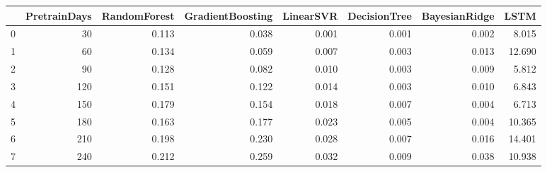\begin{tabular}{lrrrrrrr}
\toprule
{} &  PretrainDays &  RandomForest &  GradientBoosting &  LinearSVR &  DecisionTree &  BayesianRidge &   LSTM \\
\midrule
0 &            30 &         0.113 &             0.038 &      0.001 &         0.001 &          0.002 &  8.015 \\
1 &            60 &         0.134 &             0.059 &      0.007 &         0.003 &          0.013 & 12.690 \\
2 &            90 &         0.128 &             0.082 &      0.010 &         0.003 &          0.009 &  5.812 \\
3 &           120 &         0.151 &             0.122 &      0.014 &         0.003 &          0.010 &  6.843 \\
4 &           150 &         0.179 &             0.154 &      0.018 &         0.007 &          0.004 &  6.713 \\
5 &           180 &         0.163 &             0.177 &      0.023 &         0.005 &          0.004 & 10.365 \\
6 &           210 &         0.198 &             0.230 &      0.028 &         0.007 &          0.016 & 14.401 \\
7 &           240 &         0.212 &             0.259 &      0.032 &         0.009 &          0.038 & 10.938 \\
\bottomrule
\end{tabular}
